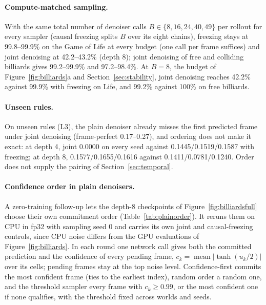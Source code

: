 \documentclass[11pt]{article}
\begin{document}
\paragraph{Compute-matched sampling.}
With the same total number of denoiser calls $B\in\{8,16,24,40,49\}$ per rollout for every sampler (causal freezing splits $B$ over its eight chains), freezing stays at 99.8--99.9\% on the Game of Life at every budget (one call per frame suffices) and joint denoising at 42.2--43.2\% (depth 8); joint denoising of free and colliding billiards gives 99.2--99.9\% and 97.2--98.4\%. At $B=8$, the budget of Figure~\ref{fig:billiards}a and Section~\ref{sec:stability}, joint denoising reaches 42.2\% against 99.9\% with freezing on Life, and 99.2\% against 100\% on free billiards.

\paragraph{Unseen rules.}
On unseen rules (L3), the plain denoiser already misses the first predicted frame under joint denoising (frame-perfect 0.17--0.27), and ordering does not make it exact: at depth 4, joint 0.0000 on every seed against 0.1445/0.1519/0.1587 with freezing; at depth 8, 0.1577/0.1655/0.1616 against 0.1411/0.0781/0.1240. Order does not supply the pairing of Section~\ref{sec:temporal}.

\paragraph{Confidence order in plain denoisers.}
A zero-training follow-up lets the depth-8 checkpoints of Figure~\ref{fig:billiardsfull} choose their own commitment order (Table~\ref{tab:plainorder}). It reruns them on CPU in fp32 with sampling seed 0 and carries its own joint and causal-freezing controls, since CPU noise differs from the GPU evaluations of Figure~\ref{fig:billiards}. In each round one network call gives both the committed prediction and the confidence of every pending frame, $c_k=\operatorname{mean}|\tanh(u_k/2)|$ over its cells; pending frames stay at the top noise level. Confidence-first commits the most confident frame (ties to the earliest index), random order a random one, and the threshold sampler every frame with $c_k\ge0.99$, or the most confident one if none qualifies, with the threshold fixed across worlds and seeds.
\end{document}
